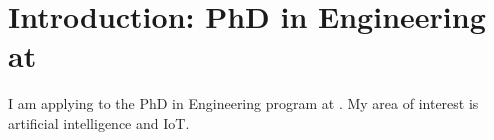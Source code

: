\section*{Introduction: PhD in Engineering at \schoolShort}
I am applying to the PhD in Engineering program at \schoolLong. 
My area of interest is artificial intelligence and IoT.